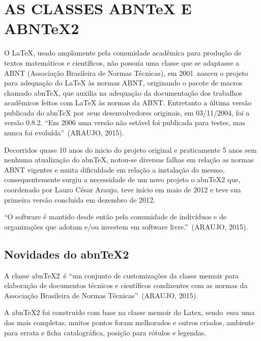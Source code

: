 \section[AS CLASSES ABNTeX E ABNTeX2]{ AS CLASSES ABNTeX E ABNTeX2}

\bigskip

{
\textrm{O {\LaTeX}, usado amplamente pela comunidade acad\^emica para produ\c{c}\~ao de textos matem\'aticos e
cient\'ificos, n\~ao possu\'ia uma classe que se adaptasse a ABNT (Associa\c{c}\~ao Brasileira de Normas T\'ecnicas),
em 2001\ nasceu o projeto para adequa\c{c}\~ao do {\LaTeX} \`as normas ABNT, originando o pacote de macros chamado
abnTeX, que auxilia na adequa\c{c}\~ao da documenta\c{c}\~ao dos trabalhos acad\^emicos feitos com {\LaTeX} \`as normas
da ABNT. Entretanto a \'ultima vers\~ao publicada do abnTeX por\ seus desenvolvedores originais, em 03/11/2004, foi a
vers\~ao 0.8.2. ``Em 2006 uma vers\~ao n\~ao est\'avel foi publicada para testes, mas nunca foi evolu\'ida''\ (ARAUJO,
2015).}}

{
Decorridos quase 10 anos do inicio do projeto original e praticamente 5 anos sem nenhuma atualiza\c{c}\~ao do abnTeX,
notou-se diversas falhas em rela\c{c}\~ao as normas ABNT vigentes e muita dificuldade em rela\c{c}\~ao a
instala\c{c}\~ao do mesmo, consequentemente surgiu a necessidade de um novo projeto o abnTeX2 que, coordenado por Lauro
C\'esar Araujo, teve in\'icio em maio de 2012 e teve sua primeira vers\~ao conclu\'ida em dezembro de 2012.}

{
\textrm{{}``O software \'e mantido desde ent\~ao pela comunidade de indiv\'iduos e de organiza\c{c}\~oes que adotam e/ou
investem em software livre.''\ (ARAUJO, 2015).}}


\bigskip

\subsection[Novidades do abnTeX2]{ Novidades do abnTeX2}

\bigskip

{
\textrm{A classe abnTeX2\ \'e ``um conjunto de customiza\c{c}\~oes da classe memoir para elabora\c{c}\~ao de documentos
t\'ecnicos e cient\'ificos condizentes com as normas da Associa\c{c}\~ao Brasileira de Normas T\'ecnicas''\ (ARAUJO,
2015).}}

{
A abnTeX2 foi constru\'ido com base na classe memoir do Latex, sendo\ essa uma das mais completas, muitos pontos foram
melhorados e outros criados, ambiente para errata e ficha catalogr\'afica, posi\c{c}\~ao para r\'otulos e legendas.}


